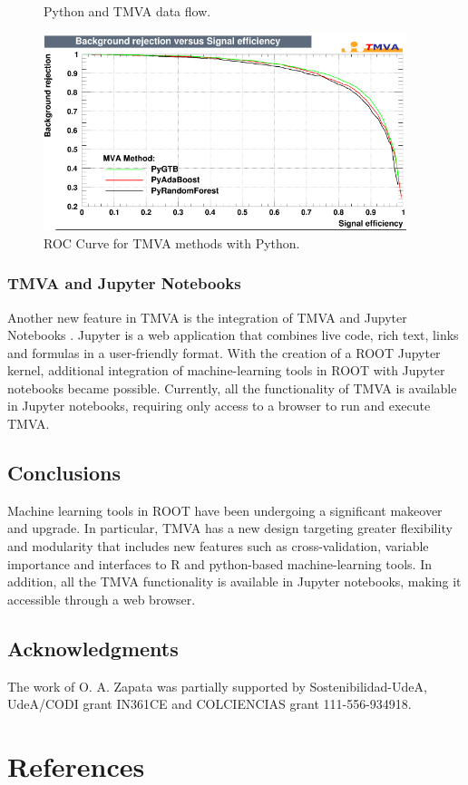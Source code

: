 \documentclass[a4paper]{jpconf}
\begin{document}
\begin{figure}[h]
\begin{minipage}{15pc}
\caption{\label{pymvadf}Python and TMVA data flow.}
\end{minipage}\hspace{2pc}%
\vspace{2pc}
\includegraphics[width=25pc]{img/pymvaroc.png}\caption{\label{pymvaroc} ROC Curve for TMVA methods with Python.}
\end{figure}





\subsubsection{TMVA and Jupyter Notebooks}
Another new feature in TMVA is the integration of TMVA and Jupyter Notebooks \cite{PER-GRA:2007}. Jupyter is a web application that combines live code, rich text, links and formulas in a user-friendly format. With the creation of a ROOT Jupyter kernel, additional integration of machine-learning tools in ROOT with Jupyter notebooks became possible. Currently, all the functionality of TMVA is available in Jupyter notebooks, requiring only access to a browser to run and execute TMVA.

\subsection{Conclusions}
Machine learning tools in ROOT have been undergoing a significant makeover and upgrade. In particular, TMVA has a new design targeting greater flexibility and modularity that includes new features such as cross-validation, variable importance and interfaces to R and python-based machine-learning tools. In addition, all the TMVA functionality is available in Jupyter notebooks, making it accessible through a web browser.

\subsection{Acknowledgments}
The work of O. A. Zapata was partially supported by Sostenibilidad-UdeA, UdeA/CODI grant IN361CE and COLCIENCIAS grant 111-556-934918.\newline

\section*{References}

\end{document}
